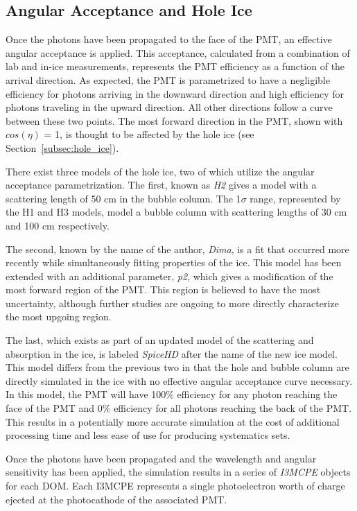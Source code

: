 \subsection{Angular Acceptance and Hole Ice}
\label{subsec:holeice_sim}
Once the photons have been propagated to the face of the PMT, an effective angular acceptance is applied.
This acceptance, calculated from a combination of lab and in-ice measurements, represents the PMT efficiency as a function of the arrival direction.
As expected, the PMT is parametrized to have a negligible efficiency for photons arriving in the downward direction and high efficiency for photons traveling in the upward direction.
All other directions follow a curve between these two points.
The most forward direction in the PMT, shown with $cos(\eta)$ = 1, is thought to be affected by the hole ice (see Section~\ref{subsec:hole_ice}). 

There exist three models of the hole ice, two of which utilize the angular acceptance parametrization.
The first, known as \emph{H2} gives a model with a scattering length of 50 cm in the bubble column. 
The 1$\sigma$ range, represented by the H1 and H3 models, model a bubble column with scattering lengths of 30 cm and 100 cm respectively.

The second, known by the name of the author, \emph{Dima}, is a fit that occurred more recently while simultaneously fitting properties of the ice.
This model has been extended with an additional parameter, \emph{p2}, which gives a modification of the most forward region of the PMT.
This region is believed to have the most uncertainty, although further studies are ongoing to more directly characterize the most upgoing region.

The last, which exists as part of an updated model of the scattering and absorption in the ice, is labeled \emph{SpiceHD} after the name of the new ice model. 
This model differs from the previous two in that the hole and bubble column are directly simulated in the ice with no effective angular acceptance curve necessary.
In this model, the PMT will have 100\% efficiency for any photon reaching the face of the PMT and 0\% efficiency for all photons reaching the back of the PMT.
This results in a potentially more accurate simulation at the cost of additional processing time and less ease of use for producing systematics sets.

Once the photons have been propagated and the wavelength and angular sensitivity has been applied, the simulation results in a series of \emph{I3MCPE} objects for each DOM. Each I3MCPE represents a single photoelectron worth of charge ejected at the photocathode of the associated PMT. 